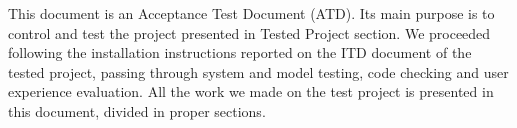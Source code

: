 This document is an Acceptance Test Document (ATD). Its main purpose is to control and test the project presented in Tested Project section. We proceeded following the installation instructions reported on the ITD document of the tested project, passing through system and model testing, code checking and user experience evaluation. All the work we made on the test project is presented in this document, divided in proper sections.